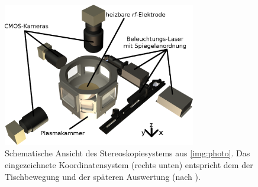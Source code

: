 \documentclass[numbers=noenddot,a4paper,notitlepage,twoside,BCOR15mm]{scrbook}
\begin{document}
				\begin{figure}[!t]
					\centering
					\includegraphics[width=0.75\textwidth,height=0.55\textwidth]{figs/witharrowsnunu.png}
					\caption{Schematische Ansicht des Stereoskopiesystems aus \autoref{img:photo}. Das eingezeichnete Koordinatensystem (rechts unten) entspricht dem der Tischbewegung und der späteren Auswertung (nach \cite{Mulsow13}).}
					\label{img:plasmakammer}
				\end{figure}
\end{document}

